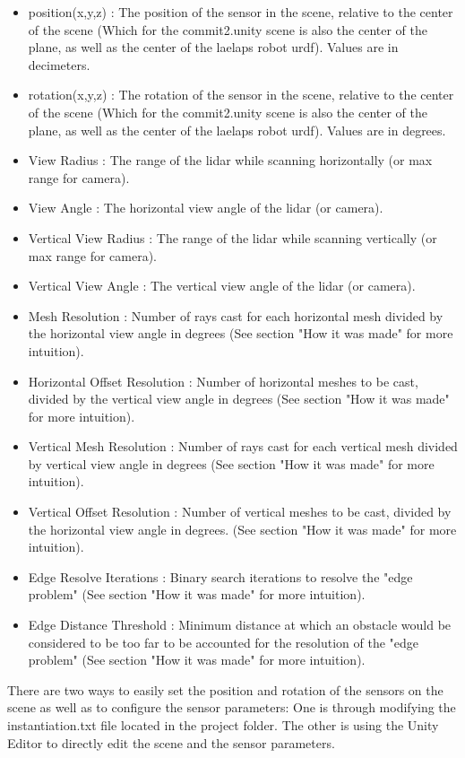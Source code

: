 \documentclass{article}
\begin{document}
\begin{itemize}

\item position(x,y,z) : The position of the sensor in the scene, relative to the center of the scene (Which for the commit2.unity scene is also the center of the plane, as well as the center of the laelaps robot urdf). Values are in decimeters.
\item rotation(x,y,z) :  The rotation of the sensor in the scene, relative to the center of the scene (Which for the commit2.unity scene is also the center of the plane, as well as the center of the laelaps robot urdf). Values are in degrees.
\item View Radius : The range of the lidar while scanning horizontally (or max range for camera). 
\item View Angle : The horizontal view angle of the lidar (or camera).
\item Vertical View Radius : The range of the lidar while scanning vertically (or max range for camera).
\item Vertical View Angle : The vertical view angle of the lidar (or camera).
\item Mesh Resolution : Number of rays cast for each horizontal mesh divided by the horizontal view angle in degrees (See section "How it was made" for more intuition).
\item Horizontal Offset Resolution : Number of horizontal meshes to be cast, divided by the vertical view angle in degrees (See section "How it was made" for more intuition).
\item Vertical Mesh Resolution : Number of rays cast for each vertical mesh divided by vertical view angle in degrees (See section "How it was made" for more intuition).
\item Vertical Offset Resolution : Number of vertical meshes to be cast, divided by the horizontal view angle in degrees. (See section "How it was made" for more intuition). 
\item Edge Resolve Iterations : Binary search iterations to resolve the "edge problem" (See section "How it was made" for more intuition). 
\item Edge Distance Threshold : Minimum distance at which an obstacle would be considered to be too far to be accounted for the resolution of the "edge problem" (See section "How it was made" for more intuition). 

\end{itemize}

There are two ways to easily set the position and rotation of the sensors on the scene as well as to configure the sensor parameters: One is through modifying the instantiation.txt file located in the project folder. The other is using the Unity Editor to directly edit the scene and the sensor parameters.
\end{document}
